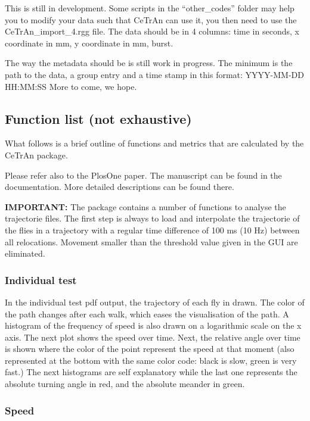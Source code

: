 \documentclass[11pt,a4paper]{article}
\begin{document}
This is still in development. Some scripts in the "`other\_codes"' folder may help you to modify your data such that CeTrAn can use it, you then need to use the CeTrAn\_import\_4.rgg file. The data should be in 4 columns: time in seconds, x coordinate in mm, y coordinate in mm, burst.

The way the metadata should be is still work in progress. The minimum is the path to the data, a group entry and a time stamp in this format: YYYY-MM-DD HH:MM:SS
More to come, we hope.

\subsection{Function list (not exhaustive)}

What follows is a brief outline of functions and metrics that are calculated by the CeTrAn package. 

Please refer also to the PlosOne paper. The manuscript can be found in the documentation. More detailed descriptions can be found there.

{\bf IMPORTANT:} The package contains a number of functions to analyse the trajectorie files. The first step is always to load and interpolate the trajectorie of the flies in a trajectory with a regular time difference of 100 ms (10 Hz) between all relocations. Movement smaller than the threshold value given in the GUI are eliminated.

\subsubsection{Individual test}
\label{sec:individualTest}

In the individual test pdf output, the trajectory of each fly in drawn. The color of the path changes after each walk, which eases the visualisation of the path. A histogram of the frequency of speed is also drawn on a logarithmic scale on the x axis. The next plot shows the speed over time. Next, the relative angle over time is shown where the color of the point represent the speed at that moment (also represented at the bottom with the same color code: black is slow, green is very fast.) The next histograms are self explanatory while the last one represents the absolute turning angle in red, and the absolute meander in green. 


\subsubsection{Speed}
\end{document}
